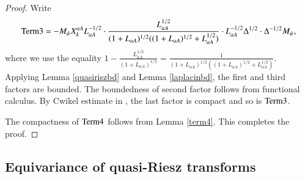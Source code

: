 \documentclass[leqno]{amsart}
\begin{document}
\begin{proof}
		Write
		\begin{align*}
			{\rm Term3}=-M_{\psi}X_{k}^{aA}L_{aA}^{-1/2}\cdot
			\frac{ L_{aA}^{1/2}}{(1+ L_{aA})^{1/2}((1+ L_{aA})^{1/2}+ L_{aA}^{1/2})}
			\cdot L_{aA}^{-1/2}\Delta^{1/2}\cdot\Delta^{-1/2}M_{\psi},
		\end{align*}
		where we use the equality $1-\frac{L_{aA}^{1/2}}{(1+ L_{aA})^{1/2}}=\frac{1}{(1+ L_{aA})^{1/2}((1+ L_{aA})^{1/2}+ L_{aA}^{1/2})}$.
		Applying Lemma \ref{quasiriszbd} and  Lemma \ref{laplacinbd}, the first and third factors are bounded. 
		The boundedness of second factor follows from functional calculus.
		By Cwikel estimate in \cite{MSZ-Cwikel}, the last factor is compact and so is ${\rm Term3}$.
		
		The compactness of ${\rm Term4}$ follows from Lemma \ref{term4}.
		This completes the proof. 
	\end{proof}
	
	
	
	
	
	
	
	
	\subsection{Equivariance of quasi-Riesz transforms}
	
\end{document}
